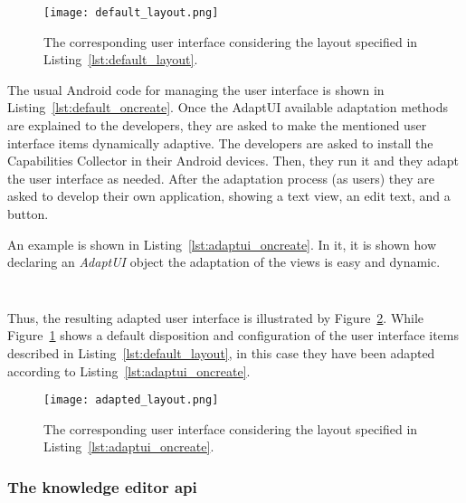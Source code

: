 \inputminted[linenos=true, fontsize=\footnotesize, frame=lines]{xml}{5_experiments_and_results/default_layout.xml}

\begin{figure}
\centering
\texttt{[image: default\_layout.png]}
\caption{The corresponding user interface considering the layout specified in
Listing~\ref{lst:default_layout}.}
\label{fig:default_layout}
\end{figure}

The usual Android code for managing the user interface is shown in Listing~\ref{lst:default_oncreate}.
Once the AdaptUI available adaptation methods are explained to the developers,
they are asked to make the mentioned user interface items dynamically adaptive.
The developers are asked to install the Capabilities Collector in their Android
devices. Then, they run it and they adapt the user interface as needed. After
the adaptation process (as users) they are asked to develop their own application,
showing a text view, an edit text, and a button. 

An example is shown in Listing~\ref{lst:adaptui_oncreate}. In it, it is shown 
how declaring an \textit{AdaptUI} object the adaptation of the views is easy and 
dynamic.

\inputminted[linenos=true, fontsize=\footnotesize, frame=lines]{java}{5_experiments_and_results/default_oncreate.java}

\inputminted[linenos=true, fontsize=\footnotesize, frame=lines]{java}{5_experiments_and_results/adaptui_oncreate.java}

Thus, the resulting adapted user interface is illustrated by Figure~\ref{fig:adapted_layout}.
While Figure~\ref{fig:default_layout} shows a default disposition and configuration
of the user interface items described in Listing~\ref{lst:default_layout}, in this
case they have been adapted according to Listing~\ref{lst:adaptui_oncreate}.

\begin{figure}
\centering
\texttt{[image: adapted\_layout.png]}
\caption{The corresponding user interface considering the layout specified in
Listing~\ref{lst:adaptui_oncreate}.}
\label{fig:adapted_layout}
\end{figure}



\subsubsection{The knowledge editor \ac{api}}
\label{sec:knowledge_api}

